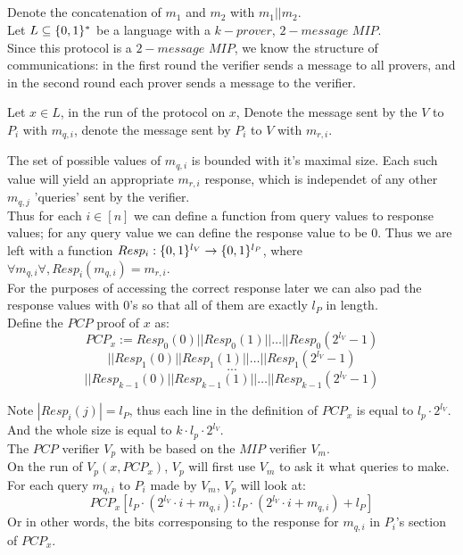 \subsection{}
Denote the concatenation of $m_1$ and $m_2$
with $m_1||m_2$.\\
Let $L\subseteq\{0,1\}^*$ be a language with a $k-prover$,
$2-message$ $MIP$.\\
Since this protocol is a $2-message$ $MIP$,
we know the structure of communications: in the
first round the verifier sends a message to all provers,
and in the second round each prover sends a message to the
verifier.

Let $x\in L$, in the run of the protocol on $x$,
Denote the message sent by the $V$
to $P_i$ with $m_{q,i}$,
denote the message sent
by $P_i$ to $V$ with $m_{r,i}$.

The set of possible values of $m_{q,i}$ is
bounded with it's maximal size. Each such value
will yield an appropriate $m_{r,i}$ response,
which is independet of any other $m_{q,j}$ 'queries'
sent by the verifier.\\
Thus for each $i\in[n]$ we can 
define a function from query values to response values;
for any query value we can define the response value
to be $0$.
Thus we are left with a function $Resp_i:\{0,1\}^{l_V}\rightarrow \{0,1\}^{l_P}$,
where $\forall m_{q,i}\forall, Resp_i(m_{q,i})=m_{r,i}$.\\

For the purposes of accessing the correct response later we can also
pad the response values with $0$'s so that all of them are exactly $l_P$ in length.\\

Define the $PCP$ proof of $x$ as:
\[
	PCP_x:=Resp_0(0)||Resp_0(1)||\dots||Resp_0(2^{l_V}-1)
\]\[
	||Resp_1(0)||Resp_1(1)||\dots||Resp_1(2^{l_V}-1)
\]\[
	...
\]\[
	||Resp_{k-1}(0)||Resp_{k-1}(1)||\dots||Resp_{k-1}(2^{l_V}-1)
\]

Note $|Resp_i(j)|= l_P$, thus each line
in the definition of $PCP_x$ is equal to $l_p\cdot 2^{l_V}$.
And the whole size is equal to $k\cdot l_p\cdot 2^{l_V}$.\\

The $PCP$ verifier $V_p$ with be based on the $MIP$ verifier $V_m$.\\
On the run of $V_p(x,PCP_x)$, $V_p$ will first
use $V_m$ to ask it what queries to make.
For each query $m_{q,i}$ to $P_i$ made by $V_m$,
$V_p$ will look at:
\[
	PCP_x[l_P\cdot(2^{l_V}\cdot i+m_{q,i}):l_P\cdot(2^{l_V}\cdot i+m_{q,i})+l_P]
\]
Or in other words, the bits corresponsing to the response for
$m_{q,i}$ in $P_i$'s section of $PCP_x$.\\

